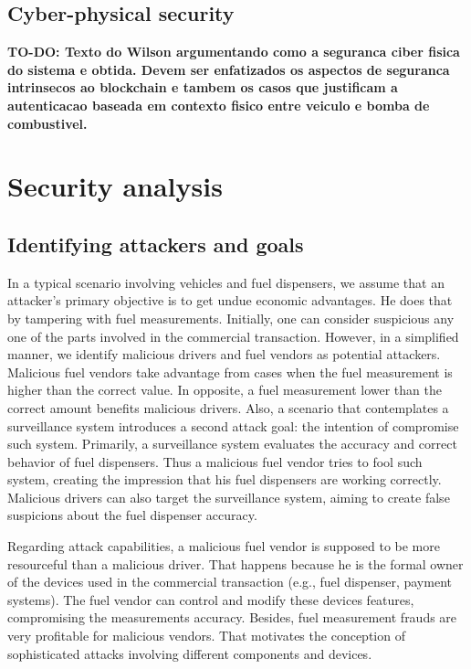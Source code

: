 \documentclass[sigplan]{acmart}
\begin{document}
\subsection{Cyber-physical security}
\textbf{TO-DO: Texto do Wilson argumentando como a seguranca ciber fisica do sistema e obtida.
Devem ser enfatizados os aspectos de seguranca intrinsecos ao blockchain e tambem os casos que justificam a autenticacao baseada em contexto fisico entre veiculo e bomba de combustivel.
}

\section{Security analysis}
\subsection{Identifying attackers and goals}
In a typical scenario involving vehicles and fuel dispensers, we assume that an attacker's primary objective is to get undue economic advantages.
He does that by tampering with fuel measurements.
Initially, one can consider suspicious any one of the parts involved in the commercial transaction.
However, in a simplified manner, we identify malicious drivers and fuel vendors as potential attackers.
Malicious fuel vendors take advantage from cases when the fuel measurement is higher than the correct value.
In opposite, a fuel measurement lower than the correct amount benefits malicious drivers.
Also, a scenario that contemplates a surveillance system introduces a second attack goal: the intention of compromise such system.
Primarily, a surveillance system evaluates the accuracy and correct behavior of fuel dispensers.
Thus a malicious fuel vendor tries to fool such system, creating the impression that his fuel dispensers are working correctly.
Malicious drivers can also target the surveillance system, aiming to create false suspicions about the fuel dispenser accuracy.

Regarding attack capabilities, a malicious fuel vendor is supposed to be more resourceful than a malicious driver. 
That happens because he is the formal owner of the devices used in the commercial transaction (e.g., fuel dispenser, payment systems).
The fuel vendor can control and modify these devices features, compromising the measurements accuracy.
Besides, fuel measurement frauds are very profitable for malicious vendors.
That motivates the conception of sophisticated attacks involving different components and devices. 
\end{document}

